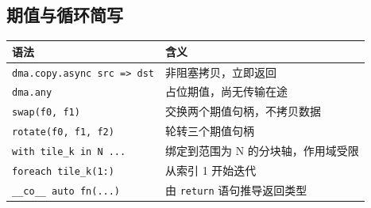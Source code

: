 \subsection*{期值与循环简写}

\begin{table}[htbp]\centering\small
\begin{tabularx}{\linewidth}{@{}lX@{}}
\toprule
\textbf{语法} & \textbf{含义} \\
\midrule
\texttt{dma.copy.async src =\textgreater{} dst} & 非阻塞拷贝，立即返回 \\
\texttt{dma.any} & 占位期值，尚无传输在途 \\
\texttt{swap(f0, f1)} & 交换两个期值句柄，不拷贝数据 \\
\texttt{rotate(f0, f1, f2)} & 轮转三个期值句柄 \\
\texttt{with tile\_k in N ...} & 绑定到范围为 N 的分块轴，作用域受限 \\
\texttt{foreach tile\_k(1:)} & 从索引 1 开始迭代 \\
\texttt{\_\_co\_\_ auto fn(...)} & 由 \texttt{return} 语句推导返回类型 \\
\bottomrule
\end{tabularx}
\end{table}
